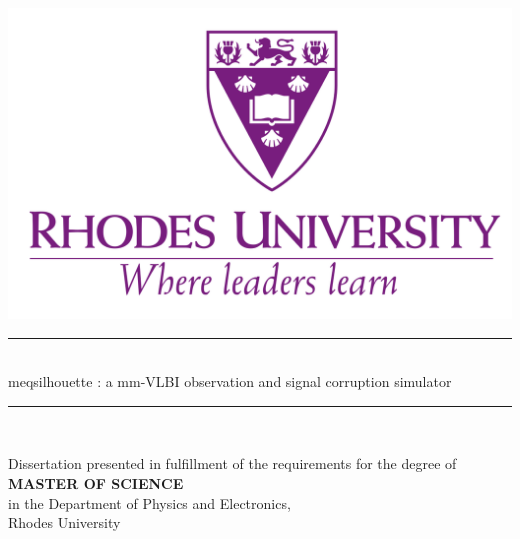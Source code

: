 \begin{titlepage}

\newcommand{\HRule}{\rule{\linewidth}{0.5mm}} %

\center %
 

\includegraphics[width=0.4\columnwidth]{Images/Rhode.png}\\[1cm] %



\HRule \\[0.4cm]
{ \huge {\sc meqsilhouette} : a mm-VLBI observation and signal corruption simulator}\\[0.4cm]
\HRule \\[1.5cm]


\begin{center}
 {\large Dissertation presented in fulfillment of the requirements for the degree of} \\
 {\large \textbf{MASTER OF SCIENCE}} \\
 {\large in the Department of Physics and Electronics,} \\
 {\large Rhodes University}
\end{center}
\vspace{0.02\textheight}



\end{titlepage}
